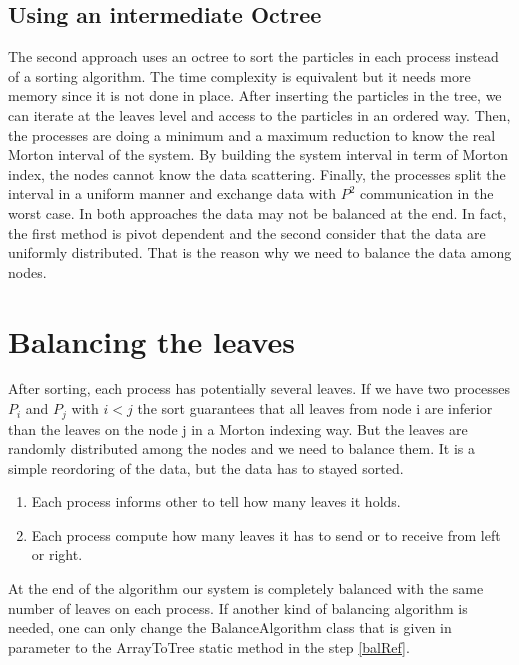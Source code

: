 \documentclass[12pt,letterpaper,titlepage]{report}
\begin{document}
\subsection{Using an intermediate Octree}
The second approach uses an octree to sort the particles in each process instead of a sorting algorithm.
The time complexity is equivalent but it needs more memory since it is not done in place.
After inserting the particles in the tree, we can iterate at the leaves level and access to the particles in an ordered way.
Then, the processes are doing a minimum and a maximum reduction to know the real Morton interval of the system.
By building the system interval in term of Morton index, the nodes cannot know the data scattering.
Finally, the processes split the interval in a uniform manner and exchange data with $P^{2}$ communication in the worst case.
\newline
\newline
In both approaches the data may not be balanced at the end.
In fact, the first method is pivot dependent and the second consider that the data are uniformly distributed.
That is the reason why we need to balance the data among nodes.

\section{Balancing the leaves}
After sorting, each process has potentially several leaves.  If we
have two processes $P_{i}$ and $P_{j}$ with $i < j$ the sort
guarantees that all leaves from node i are inferior than the leaves on
the node j in a Morton indexing way.  But the leaves are randomly
distributed among the nodes and we need to balance them.  It is a
simple reordoring of the data, but the data has to stayed sorted.

\begin{enumerate}
\item Each process informs other to tell how many leaves it holds.
\item Each process compute how many leaves it has to send or to
  receive from left or right. \label{balRef}
\end{enumerate}

At the end of the algorithm our system is completely balanced with the
same number of leaves on each process.  If another kind of balancing
algorithm is needed, one can only change the BalanceAlgorithm class
that is given in parameter to the ArrayToTree static method in the
step \ref{balRef}.
\end{document}
